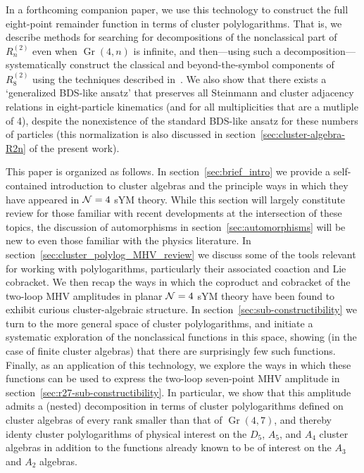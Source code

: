 \documentclass[12pt]{article}
\DeclareMathOperator{\Gr}{Gr}
\begin{document}
In a forthcoming companion paper, we use this technology to construct the full eight-point remainder function in terms of cluster polylogarithms. That is, we describe methods for searching for decompositions of the nonclassical part of $R_n^{(2)}$ even when $\Gr(4,n)$ is infinite, and then---using such a decomposition---systematically construct the classical and beyond-the-symbol components of $R_8^{(2)}$ using the techniques described in~\cite{Golden:2014xqf}. We also show that there exists a `generalized BDS-like ansatz' that preserves all Steinmann and cluster adjacency relations in eight-particle kinematics (and for all multiplicities that are a mutliple of 4), despite the nonexistence of the standard BDS-like ansatz for these numbers of particles (this normalization is also discussed in section~\ref{sec:cluster-algebra-R2n} of the present work).

This paper is organized as follows. In section~\ref{sec:brief_intro} we provide a self-contained introduction to cluster algebras and the principle ways in which they have appeared in ${\cal N} =4$ sYM theory. While this section will largely constitute review for those familiar with recent developments at the intersection of these topics, the discussion of automorphisms in section~\ref{sec:automorphisms} will be new to even those familiar with the physics literature. In section~\ref{sec:cluster_polylog_MHV_review} we discuss some of the tools relevant for working with polylogarithms, particularly their associated coaction and Lie cobracket. We then recap the ways in which the coproduct and cobracket of the two-loop MHV amplitudes in planar ${\cal N} =4$ sYM theory have been found to exhibit curious cluster-algebraic structure. In section~\ref{sec:sub-constructibility} we turn to the more general space of cluster polylogarithms, and initiate a systematic exploration of the nonclassical functions in this space, showing (in the case of finite cluster algebras) that there are surprisingly few such functions. Finally, as an application of this technology, we explore the ways in which these functions can be used to express the two-loop seven-point MHV amplitude in section~\ref{sec:r27-sub-constructibility}. In particular, we show that this amplitude admits a (nested) decomposition in terms of cluster polylogarithms defined on cluster algebras of every rank smaller than that of $\Gr(4,7)$, and thereby identy cluster polylogarithms of physical interest on the $D_5$, $A_5$, and $A_4$ cluster algebras in addition to the functions already known to be of interest on the $A_3$ and $A_2$ algebras. 
\end{document}
